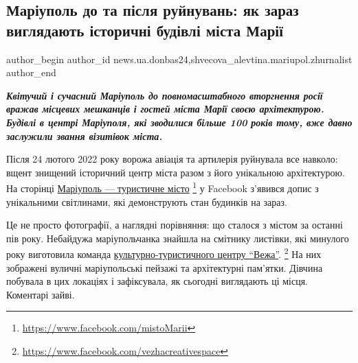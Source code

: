  
 
 
 
 
 
\subsection{Маріуполь до та після руйнувань: як зараз виглядають історичні будівлі міста Марії}
\label{sec:09_09_2022.stz.news.ua.donbas24.1.mrpl_do_i_pislja_rujnuvanj}
 
\ifcmt
 author_begin
   author_id news.ua.donbas24,shvecova_alevtina.mariupol.zhurnalist
 author_end
\fi

\begin{center}
  \em\color{blue}\bfseries\Large
Квітучий і сучасний Маріуполь до повномасштабного вторгнення росії вражав
місцевих мешканців і гостей міста Марії своєю архітектурою. Будівлі в центрі
Маріуполя, які зводилися більше 100 років тому, вже давно заслужили звання
візитівок міста.
\end{center}

Після 24 лютого 2022 року ворожа авіація та артилерія руйнувала все навколо:
вщент знищений історичний центр міста разом з його унікальною архітектурою. На
сторінці \href{https://www.facebook.com/mistoMarii}{Маріуполь — туристичне місто}%
\footnote{\url{https://www.facebook.com/mistoMarii}} у Facebook з'явився допис з унікальними світлинами, 
які демонструють стан будинків на зараз.

Це не просто фотографії, а наглядні порівняння: що сталося з містом за останні
пів року. Небайдужа маріупольчанка знайшла на смітнику листівки, які минулого
року виготовила команда \href{https://www.facebook.com/vezhacreativespace}{культурно-туристичного центру \enquote{Вежа}}.%
\footnote{\url{https://www.facebook.com/vezhacreativespace}}
На них зображені вуличні маріупольські пейзажі та архітектурні пам'ятки. Дівчина побувала в цих
локаціях і зафіксувала, як сьогодні виглядають ці місця. Коментарі зайві.


